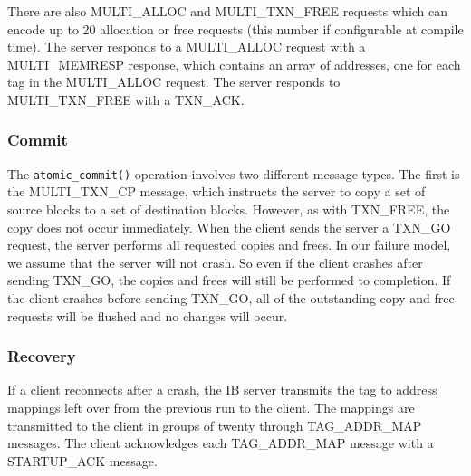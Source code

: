 There are also MULTI\_ALLOC and MULTI\_TXN\_FREE requests which can encode up
to 20 allocation or free requests (this number if configurable at compile
time). The server responds to a MULTI\_ALLOC request with a MULTI\_MEMRESP
response, which contains an array of addresses, one for each tag in the
MULTI\_ALLOC request. The server responds to MULTI\_TXN\_FREE with a TXN\_ACK.

\subsubsection{Commit}

The \texttt{atomic\_commit()} operation involves two different message types.
The first is the MULTI\_TXN\_CP message, which instructs the server to copy a
set of source blocks to a set of destination blocks. However, as with
TXN\_FREE, the copy does not occur immediately. When the client sends the
server a TXN\_GO request, the server performs all requested copies and frees.
In our failure model, we assume that the server will not crash. So even if the
client crashes after sending TXN\_GO, the copies and frees will still be
performed to completion. If the client crashes before sending TXN\_GO, all of
the outstanding copy and free requests will be flushed and no changes will
occur.

\subsubsection{Recovery}

If a client reconnects after a crash, the IB server transmits the tag to
address mappings left over from the previous run to the client. The mappings
are transmitted to the client in groups of twenty through TAG\_ADDR\_MAP
messages. The client acknowledges each TAG\_ADDR\_MAP message with a
STARTUP\_ACK message.
